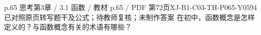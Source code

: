 \par\noindent\begin{minipage}{\linewidth}
\begin{bankitem}{p.65 思考}{第3章 / 3.1 函数 / 教材 p.65 / PDF 第72页}{XJ-B1-C03-TH-P065-Y0594}{已对照原页转写题干及公式；待教师复核；未制作答案}
在初中，函数概念是怎样定义的？与函数概念有关的术语有哪些？
\end{bankitem}
\end{minipage}\par\medskip

